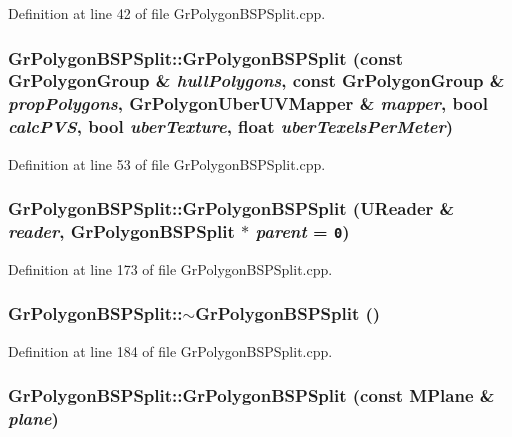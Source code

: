 Definition at line 42 of file GrPolygonBSPSplit.cpp.\hypertarget{class_gr_polygon_b_s_p_split_27240e6e1d1ae6f058d9cfc2f4e3539c}{
\subsubsection[{GrPolygonBSPSplit}]{\setlength{\rightskip}{0pt plus 5cm}GrPolygonBSPSplit::GrPolygonBSPSplit (const {\bf GrPolygonGroup} \& {\em hullPolygons}, \/  const {\bf GrPolygonGroup} \& {\em propPolygons}, \/  {\bf GrPolygonUberUVMapper} \& {\em mapper}, \/  bool {\em calcPVS}, \/  bool {\em uberTexture}, \/  float {\em uberTexelsPerMeter})}}
\label{class_gr_polygon_b_s_p_split_27240e6e1d1ae6f058d9cfc2f4e3539c}




Definition at line 53 of file GrPolygonBSPSplit.cpp.\hypertarget{class_gr_polygon_b_s_p_split_bc3191cb222385455c374f5d7a3d4d56}{
\subsubsection[{GrPolygonBSPSplit}]{\setlength{\rightskip}{0pt plus 5cm}GrPolygonBSPSplit::GrPolygonBSPSplit ({\bf UReader} \& {\em reader}, \/  {\bf GrPolygonBSPSplit} $\ast$ {\em parent} = {\tt 0})}}
\label{class_gr_polygon_b_s_p_split_bc3191cb222385455c374f5d7a3d4d56}




Definition at line 173 of file GrPolygonBSPSplit.cpp.\hypertarget{class_gr_polygon_b_s_p_split_4976f28cdf9918a062268bf48bc33169}{
\subsubsection[{$\sim$GrPolygonBSPSplit}]{\setlength{\rightskip}{0pt plus 5cm}GrPolygonBSPSplit::$\sim$GrPolygonBSPSplit ()}}
\label{class_gr_polygon_b_s_p_split_4976f28cdf9918a062268bf48bc33169}




Definition at line 184 of file GrPolygonBSPSplit.cpp.\hypertarget{class_gr_polygon_b_s_p_split_97acdea709174afce4d84deb115abc9b}{
\subsubsection[{GrPolygonBSPSplit}]{\setlength{\rightskip}{0pt plus 5cm}GrPolygonBSPSplit::GrPolygonBSPSplit (const {\bf MPlane} \& {\em plane})}}
\label{class_gr_polygon_b_s_p_split_97acdea709174afce4d84deb115abc9b}




